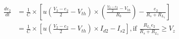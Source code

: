 \begin{align}
    \frac{de_2}{dt} &= \frac{1}{C} \times \left[ u\left(\frac{V_2-e_2}{2}-V_{th}\right) \times \left(\frac{\frac{V_2-e_2}{2}-V_{th}}{R_b}\right) - \frac{e_2}{R_s+R_{L_1}} \right] \\
    &= \frac{1}{C} \times \left[ u\left(\frac{V_2-e_2}{2}-V_{th}\right) \times I_{d2} - I_{s2} \right], \text{if } \frac{R_{L_1}e_2}{R_s+R_{L_1}} \geq V_z
\end{align}
%
%
%
%
%
%
%
